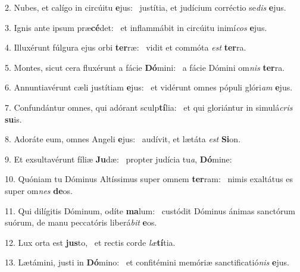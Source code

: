 2. Nubes, et calígo in circúitu \textbf{e}jus: \ast\  justítia, et judícium corréctio se\textit{dis} \textbf{e}jus.\

3. Ignis ante ipsum præ\textbf{cé}det: \ast\  et inflammábit in circúitu inimí\textit{cos} \textbf{e}jus.\

4. Illuxérunt fúlgura ejus orbi \textbf{ter}ræ: \ast\  vidit et commóta \textit{est} \textbf{ter}ra.\

5. Montes, sicut cera fluxérunt a fácie \textbf{Dó}mini: \ast\  a fácie Dómini om\textit{nis} \textbf{ter}ra.\

6. Annuntiavérunt cæli justítiam \textbf{e}jus: \ast\  et vidérunt omnes pópuli glóri\textit{am} \textbf{e}jus.\

7. Confundántur omnes, qui adórant sculp\textbf{tí}lia: \ast\  et qui gloriántur in simulá\textit{cris} \textbf{su}is.\

8. Adoráte eum, omnes Angeli \textbf{e}jus: \ast\  audívit, et lætáta \textit{est} \textbf{Si}on.\

9. Et exsultavérunt fíliæ \textbf{Ju}dæ: \ast\  propter judícia tu\textit{a}, \textbf{Dó}mine:\

10. Quóniam tu Dóminus Altíssimus super omnem \textbf{ter}ram: \ast\  nimis exaltátus es super om\textit{nes} \textbf{de}os.\

11. Qui dilígitis Dóminum, odíte \textbf{ma}lum: \ast\  custódit Dóminus ánimas sanctórum suórum, de manu peccatóris liberá\textit{bit} \textbf{e}os.\

12. Lux orta est \textbf{jus}to, \ast\  et rectis corde \textit{læ}\textbf{tí}tia.\

13. Lætámini, justi in \textbf{Dó}mino: \ast\  et confitémini memóriæ sanctificatió\textit{nis} \textbf{e}jus.\

